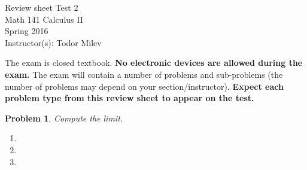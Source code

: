 \documentclass{article}
\renewcommand{\fcProblemRef}{\theproblem.\theenumi}
\newtheorem{problem}{Problem}
\begin{document}
\begin{center}
\Large
Review sheet Test 2 \\ Math 141 Calculus II \\ \normalsize Spring 2016 \\ Instructor(s): Todor Milev
\end{center}



\noindent The exam is closed textbook. \textbf{No electronic devices are allowed during the exam. } The exam will contain a number of problems and sub-problems (the number of problems may depend on your section/instructor). \textbf{Expect each problem type from this review sheet to appear on the test.}%

\begin{problem}Compute the limit.
\begin{enumerate}[ref={\fcProblemRef}]
\item 
\item 
\item 
\end{enumerate}
\end{problem}

\end{document}
